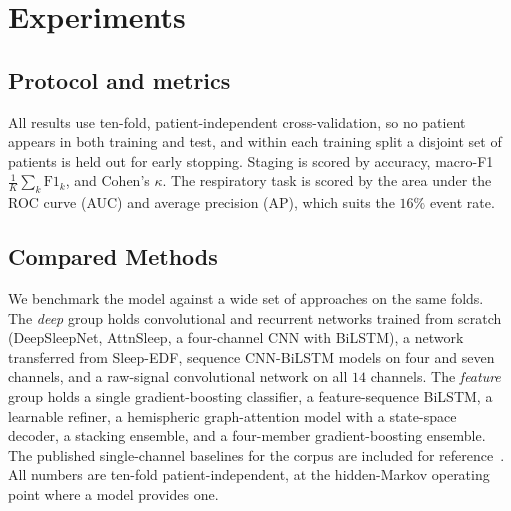 \documentclass[journal]{IEEEtran}
\begin{document}
\section{Experiments}
\label{sec:results}
\subsection{Protocol and metrics}
All results use ten-fold, patient-independent cross-validation, so no patient appears in both
training and test, and within each training split a disjoint set of patients is held out for
early stopping. Staging is scored by accuracy, macro-F1 $\tfrac{1}{K}\sum_k\mathrm{F1}_k$, and
Cohen's $\kappa$. The respiratory task is scored by the area under the ROC curve (AUC) and
average precision (AP), which suits the $16\%$ event rate.

\subsection{Compared Methods}
We benchmark the model against a wide set of approaches on the same folds. The \emph{deep}
group holds convolutional and recurrent networks trained from scratch (DeepSleepNet,
AttnSleep, a four-channel CNN with BiLSTM), a network transferred from Sleep-EDF, sequence
CNN-BiLSTM models on four and seven channels, and a raw-signal convolutional network on all
$14$ channels. The \emph{feature} group holds a single gradient-boosting classifier, a
feature-sequence BiLSTM, a learnable refiner, a hemispheric graph-attention model with a
state-space decoder, a stacking ensemble, and a four-member gradient-boosting ensemble. The
published single-channel baselines for the corpus are included for
reference~\cite{maiti2026isleeps}. All numbers are ten-fold patient-independent, at the
hidden-Markov operating point where a model provides one.
\end{document}
